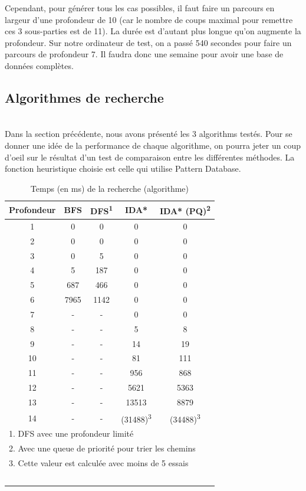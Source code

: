 \documentclass[fleqn,10pt,french]{SelfArx} %
\begin{document}
Cependant, pour générer tous les cas possibles, il faut faire un parcours en largeur d’une profondeur de 10 (car le nombre de coups maximal pour remettre ces 3 sous-parties est de 11). La durée est d’autant plus longue qu’on augmente la profondeur. Sur notre ordinateur de test, on a passé 540 secondes pour faire un parcours de profondeur 7. Il faudra donc une semaine pour avoir une base de données complètes.

\subsection{Algorithmes de recherche}

~\\\indent
Dans la section précédente, nous avons présenté les 3 algorithms testés. Pour se donner une idée de la performance de chaque algorithme, on pourra jeter un coup d’oeil sur le résultat d’un test de comparaison entre les différentes méthodes. La fonction heuristique choisie est celle qui utilise Pattern Database.

\begin{table}[htbp]
\centering
\begin{tabular}{ccccc}
\hline
\rowcolor{blue!20} \rule{0pt}{12pt} \textbf{Profondeur} & \textbf{BFS} & \textbf{DFS}\textsuperscript{1} & \textbf{IDA*} &  \textbf{IDA* (PQ)\textsuperscript{2}}\\
\hline
1 & 0 & 0 & 0 & 0  \\
2 & 0 & 0 & 0 & 0 \\
3 & 0 & 5 & 0 & 0 \\
4 & 5 & 187 & 0 & 0 \\
5 & 687 & 466 & 0 & 0 \\
6 & 7965 & 1142 & 0 & 0  \\
7 & - & - & 0 & 0 \\
8 & - & - & 5 & 8 \\
9 & - & - & 14 & 19 \\
10 & - & - & 81 & 111 \\
11 & - & - & 956 & 868 \\
12 & - & - & 5621 & 5363 \\
13 & - & - & 13513 & 8879 \\
14 & - & - & (31488)\textsuperscript{3} & (34488)\textsuperscript{3} \\
\hline
\multicolumn{5}{l}{\small{1. DFS avec une profondeur limité}} \\
\multicolumn{5}{l}{\small{2. Avec une queue de priorité pour trier les chemins}} \\
\multicolumn{5}{l}{\small{3. Cette valeur est calculée avec moins de 5 essais}} \\
\hline
~\\
\end{tabular}
\caption{Temps (en ms) de la recherche (algorithme)}
\end{table}
\end{document}
